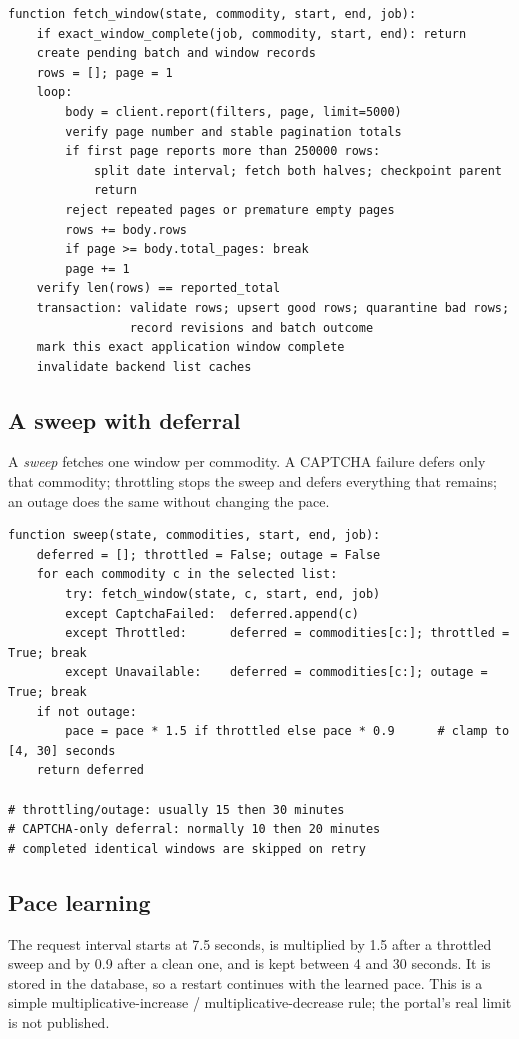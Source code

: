 \documentclass[12pt,a4paper,oneside]{report}
\numberwithin{equation}{chapter}
\numberwithin{figure}{chapter}
\numberwithin{table}{chapter}
\theoremstyle{definition}
\begin{document}
\begin{lstlisting}[caption={Fetching and checkpointing a report window}]
function fetch_window(state, commodity, start, end, job):
    if exact_window_complete(job, commodity, start, end): return
    create pending batch and window records
    rows = []; page = 1
    loop:
        body = client.report(filters, page, limit=5000)
        verify page number and stable pagination totals
        if first page reports more than 250000 rows:
            split date interval; fetch both halves; checkpoint parent
            return
        reject repeated pages or premature empty pages
        rows += body.rows
        if page >= body.total_pages: break
        page += 1
    verify len(rows) == reported_total
    transaction: validate rows; upsert good rows; quarantine bad rows;
                 record revisions and batch outcome
    mark this exact application window complete
    invalidate backend list caches
\end{lstlisting}

\subsection{A sweep with deferral}
A \emph{sweep} fetches one window per commodity. A CAPTCHA failure defers only that commodity; throttling stops the sweep and defers everything that remains; an outage does the same without changing the pace.

\begin{lstlisting}[caption={Sweep over commodities with deferral and pace adaptation}]
function sweep(state, commodities, start, end, job):
    deferred = []; throttled = False; outage = False
    for each commodity c in the selected list:
        try: fetch_window(state, c, start, end, job)
        except CaptchaFailed:  deferred.append(c)
        except Throttled:      deferred = commodities[c:]; throttled = True; break
        except Unavailable:    deferred = commodities[c:]; outage = True; break
    if not outage:
        pace = pace * 1.5 if throttled else pace * 0.9      # clamp to [4, 30] seconds
    return deferred

# throttling/outage: usually 15 then 30 minutes
# CAPTCHA-only deferral: normally 10 then 20 minutes
# completed identical windows are skipped on retry
\end{lstlisting}

\subsection{Pace learning}
The request interval starts at 7.5 seconds, is multiplied by 1.5 after a throttled sweep and by 0.9 after a clean one, and is kept between 4 and 30 seconds. It is stored in the database, so a restart continues with the learned pace. This is a simple multiplicative-increase / multiplicative-decrease rule; the portal's real limit is not published.
\end{document}
